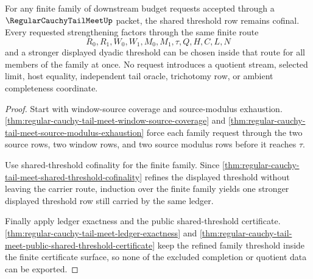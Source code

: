 \begin{theorem}
\label{thm:regular-cauchy-tail-meet-budget-family-cofinality}
For any finite family of downstream budget requests accepted through a $\RegularCauchyTailMeetUp$ packet, the shared threshold row remains cofinal. Every requested strengthening factors through the same finite route
$$
R_0,R_1,W_0,W_1,M_0,M_1,\tau,Q,H,C,L,N
$$
and a stronger displayed dyadic threshold can be chosen inside that route for all members of the family at once. No request introduces a quotient stream, selected limit, host equality, independent tail oracle, trichotomy row, or ambient completeness coordinate.
\end{theorem}
\begin{proof}
Start with window-source coverage and source-modulus exhaustion. \autoref{thm:regular-cauchy-tail-meet-window-source-coverage} and \autoref{thm:regular-cauchy-tail-meet-source-modulus-exhaustion} force each family request through the two source rows, two window rows, and two source modulus rows before it reaches $\tau$.

Use shared-threshold cofinality for the finite family. Since \autoref{thm:regular-cauchy-tail-meet-shared-threshold-cofinality} refines the displayed threshold without leaving the carrier route, induction over the finite family yields one stronger displayed threshold row still carried by the same ledger.

Finally apply ledger exactness and the public shared-threshold certificate. \autoref{thm:regular-cauchy-tail-meet-ledger-exactness} and \autoref{thm:regular-cauchy-tail-meet-public-shared-threshold-certificate} keep the refined family threshold inside the finite certificate surface, so none of the excluded completion or quotient data can be exported.
\end{proof}

